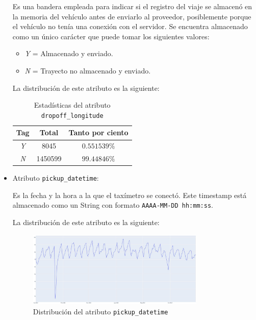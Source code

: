\documentclass[12pt]{article}
\begin{document}
\begin{itemize}
Es una bandera empleada para indicar si el registro del viaje se almacenó en la memoria del vehículo antes de enviarlo al proveedor, posiblemente porque el vehículo no tenía una conexión con el servidor. Se encuentra almacenado como un único carácter que puede tomar los siguientes valores:
    
    \begin{itemize}
        \item \textit{Y} = Almacenado y enviado.
        \item \textit{N} = Trayecto no almacenado y enviado.
    \end{itemize}

La distribución de este atributo es la siguiente:

\begin{table}[H]
\centering
\begin{tabular}{|c|c|c|}
\hline
Tag         & Total     & Tanto por ciento  \\ \hline
\textit{Y}  & 8045      & $0.551539\%$      \\ \hline
\textit{N}  & 1450599   & $99.44846\%$      \\ \hline
\end{tabular}
\caption{Estadísticas del atributo \texttt{dropoff\_longitude}}
\end{table}

    \item Atributo \texttt{pickup\_datetime}:

Es la fecha y la hora a la que el taxímetro se conectó. Este timestamp está almacenado como un String con formato \texttt{AAAA-MM-DD hh:mm:ss}.

La distribución de este atributo es la siguiente:

\begin{figure}[H]
    \centering
    \includegraphics[width=0.8\textwidth]{pickup_datetime.PNG}
    \caption{Distribución del atributo \texttt{pickup\_datetime}}
    \label{fig:dropoff_datetime}
\end{figure}


\end{itemize}
\end{document}
